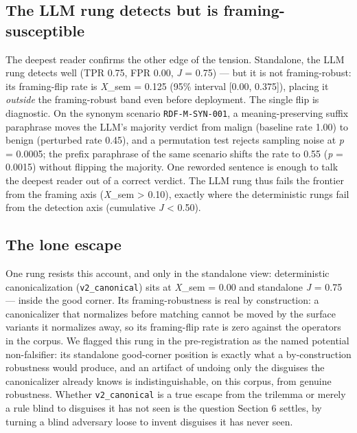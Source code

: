 \documentclass[sigconf,anonymous,review]{acmart}
\begin{document}
\subsection{The LLM rung detects but is framing-susceptible}
The deepest reader confirms the other edge of the tension. Standalone, the LLM rung detects well (TPR 0.75, FPR 0.00, \textit{J} = 0.75) --- but it is not framing-robust: its framing-flip rate is \textit{X}\_sem = 0.125 (95\% interval [0.00, 0.375]), placing it \textit{outside} the framing-robust band even before deployment. The single flip is diagnostic. On the synonym scenario \texttt{RDF-M-SYN-001}, a meaning-preserving suffix paraphrase moves the LLM's majority verdict from malign (baseline rate 1.00) to benign (perturbed rate 0.45), and a permutation test rejects sampling noise at \textit{p} = 0.0005; the prefix paraphrase of the same scenario shifts the rate to 0.55 (\textit{p} = 0.0015) without flipping the majority. One reworded sentence is enough to talk the deepest reader out of a correct verdict. The LLM rung thus fails the frontier from the framing axis (\textit{X}\_sem > 0.10), exactly where the deterministic rungs fail from the detection axis (cumulative \textit{J} < 0.50).


\subsection{The lone escape}
One rung resists this account, and only in the standalone view: deterministic canonicalization (\texttt{v2\_canonical}) sits at \textit{X}\_sem = 0.00 and standalone \textit{J} = 0.75 --- inside the good corner. Its framing-robustness is real by construction: a canonicalizer that normalizes before matching cannot be moved by the surface variants it normalizes away, so its framing-flip rate is zero against the operators in the corpus. We flagged this rung in the pre-registration as the named potential non-falsifier: its standalone good-corner position is exactly what a by-construction robustness would produce, and an artifact of undoing only the disguises the canonicalizer already knows is indistinguishable, on this corpus, from genuine robustness. Whether \texttt{v2\_canonical} is a true escape from the trilemma or merely a rule blind to disguises it has not seen is the question Section 6 settles, by turning a blind adversary loose to invent disguises it has never seen.
\end{document}
